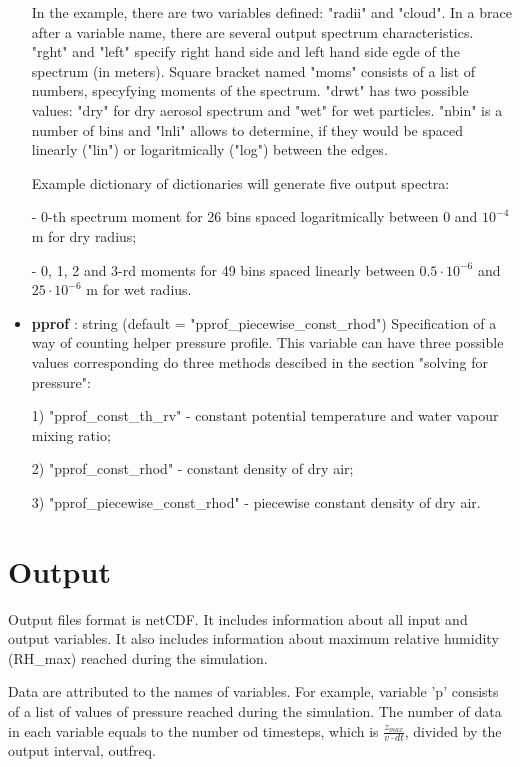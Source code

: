 \documentclass[11pt]{article}
\begin{document}
\begin{itemize}
In the example, there are two variables defined: "radii" and "cloud". In a brace after a variable name, there are several output spectrum characteristics. "rght" and "left" specify right hand side and left hand side egde of the spectrum (in meters). Square bracket named "moms" consists of a list of numbers, specyfying moments of the spectrum. "drwt" has two possible values: "dry" for dry aerosol spectrum and "wet" for wet particles. "nbin" is a number of bins and "lnli" allows to determine, if they would be spaced linearly ("lin") or logaritmically ("log") between the edges.

Example dictionary of dictionaries will generate five output spectra:

- 0-th spectrum moment for 26 bins spaced logaritmically between 0 and $10^{-4}$ m for dry radius;

- 0, 1, 2 and 3-rd moments for 49 bins spaced linearly between $0.5\cdot10^{-6}$ and $25\cdot10^{-6}$ m for wet radius.

\item \textbf{pprof} : string (default = "pprof\_piecewise\_const\_rhod") \newline Specification of a way of counting helper pressure profile. This variable can have three possible values corresponding do three methods descibed in the section "solving for pressure":

1) "pprof\_const\_th\_rv" - constant potential temperature and water vapour mixing ratio;

2) "pprof\_const\_rhod" - constant density of dry air;

3) "pprof\_piecewise\_const\_rhod" - piecewise constant density of dry air.

\end{itemize}

\section{Output}

Output files format is netCDF. It includes information about all input and output variables. It also includes information about maximum relative humidity (RH\_max) reached during the simulation.

Data are attributed to the names of variables. For example, variable 'p' consists of a list of values of pressure reached during the simulation. The number of data in each variable equals to the number od timesteps, which is $\frac{z_{max}}{v\cdot dt}$, divided by the output interval, outfreq. 
\end{document}
